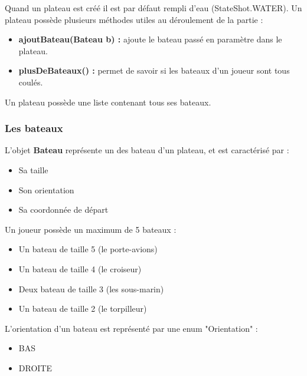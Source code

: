 \par Quand un plateau est créé il est par défaut rempli d'eau (StateShot.WATER). Un plateau possède plusieurs méthodes utiles au déroulement de la partie :  
\\
\begin{itemize}
\item{\textbf{ajoutBateau(Bateau b) :}} ajoute le bateau passé en paramètre dans le plateau.
\item{\textbf{plusDeBateaux() :}} permet de savoir si les bateaux d'un joueur sont tous coulés.\\
\end{itemize}
Un plateau possède une liste contenant tous ses bateaux.

\subsubsection{Les bateaux}
\par L'objet \textbf{Bateau} représente un des bateau d'un plateau, et est caractérisé par :\\

\begin{itemize}
\item{Sa taille}
\item{Son orientation}
\item{Sa coordonnée de départ}\\
\end{itemize}

Un joueur possède un maximum de 5 bateaux :\\

\begin{itemize}
\item{Un bateau de taille 5 (le porte-avions)}
\item{Un bateau de taille 4 (le croiseur)}
\item{Deux bateau de taille 3 (les sous-marin)}
\item{Un bateau de taille 2 (le torpilleur)}\\
\end{itemize}

L'orientation d'un bateau est représenté par une enum "Orientation" : \\

\begin{itemize}
\item{BAS}
\item{DROITE}\\
\end{itemize}

